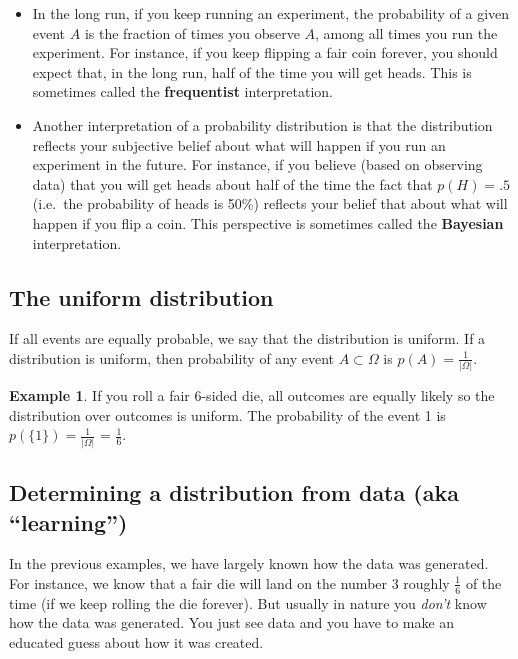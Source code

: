 \documentclass[]{article}
\theoremstyle{definition}
\newtheorem{exmp}{Example}[section]
\begin{document}
\begin{itemize}
\item In the long run, if you keep running an experiment, the probability of a given event $A$ is the fraction of times you observe $A$, among all times you run the experiment. For instance, if you keep flipping a fair coin forever, you should expect that, in the long run, half of the time you will get heads. This is sometimes called the \textbf{frequentist} interpretation. 
\item Another interpretation of a probability distribution is that the distribution reflects your subjective belief about what will happen if you run an experiment in the future. For instance, if you believe (based on observing data) that you will get heads about half of the time the fact that $p(H)=.5$ (i.e.\ the probability of heads is 50\%) reflects your belief that about what will happen if you flip a coin. This perspective is sometimes called the \textbf{Bayesian} interpretation.
\end{itemize}

\subsection{The uniform distribution}

If all events are equally probable, we say that the distribution is uniform. If a distribution is uniform, then probability of any event $A \subset \Omega$ is $p(A)=\frac{1}{\vert \Omega \vert}$.

\begin{exmp}
If you roll a fair 6-sided die, all outcomes are equally likely so the distribution over outcomes is uniform. The probability of the event 1 is $p(\{1\})=\frac{1}{\vert \Omega \vert}$ = $\frac{1}{6}$.
\end{exmp}

\subsection{Determining a distribution from data (aka ``learning'')}

In the previous examples, we have largely known how the data was generated. For instance, we know that a fair die will land on the number 3 roughly $\frac{1}{6}$ of the time (if we keep rolling the die forever). But usually in nature you \textit{don't} know how the data was generated. You just see data and you have to make an educated guess about how it was created. 
\end{document}
